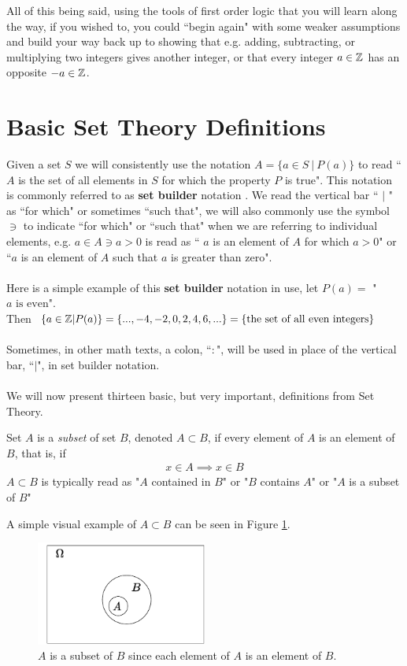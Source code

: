 All of this being said, using the tools of first order logic that you will learn along the way, if you wished to, you could ``begin again" with some weaker assumptions and build your way back up to showing that e.g. adding, subtracting, or multiplying two integers gives another integer, or that every integer $a\in{\mathbb{ Z}}$ has an opposite $-a\in{\mathbb{ Z}}$. 

\section{Basic Set Theory Definitions}
\label{sec:BasicSetTheory}
Given a set $S$ we will consistently use the notation $A=\{a\in S\ |\ P(a)\}$ to read `` $A$ is the set of all elements in $S$ for which the property $P$ is true". This notation is commonly referred to as \textbf{set builder} notation . We read the vertical bar `` $|$ " as ``for which" or sometimes ``such that", we will also commonly use the symbol $\ni$ to indicate ``for which" or ``such that" when we are referring to individual elements, e.g. $a\in A \ni a>0$ is read as `` $a$ is an element of $A$ for which $a>0$" or ``$a$ is an element of $A$ such that $a$ is greater than zero". \\ \\
\noindent Here is a simple example of this \textbf{set builder} notation in use, let $P(a)=$ "$a \text{ is even}$". \\
Then $\{a\in {\mathbb{ Z}} | P(a)\} = \{...,-4,-2,0,2,4,6,...\} = \{ \text{the set of all even integers}\}$ \\ \\
Sometimes, in other math texts, a colon, ``$:$", will be used in place of the vertical bar, ``$|$", in set builder notation.\\ \\
\noindent We will now present thirteen basic, but very important, definitions from Set Theory. \newpage
\begin{definition}[Subset]\index{$\subset$}
Set $A$ is a \textit{subset} of set $B$, denoted $A\subset B$, if every element of $A$ is an element of $B$, that is, if
\begin{align}
    x\in A \implies x\in B \nonumber
\end{align}
$A\subset B$ is typically read as "$A$ contained in $B$" or "$B$ contains $A$" or "$A$ is a subset of $B$"
\end{definition}
A simple visual example of $A\subset B$ can be seen in Figure \ref{fig:Subset_example}.
\begin{figure}[h!]
    \centering
    \includegraphics[width=0.5\textwidth]{Figures/SUBSET_Example.pdf}
    \caption{$A$ is a subset of $B$ since each element of $A$ is an element of $B$.}
    \label{fig:Subset_example}
\end{figure}\\
